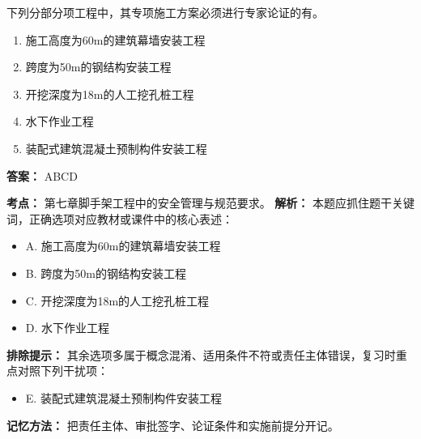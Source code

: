 \documentclass[UTF8,fontset=fandol,11pt]{ctexart}
\begin{document}
\begin{quizbox}[title={第 7 题}]
下列分部分项工程中，其专项施工方案必须进行专家论证的有。\\
\begin{enumerate}[label=\Alph*.]
\item 施工高度为60m的建筑幕墙安装工程
\item 跨度为50m的钢结构安装工程
\item 开挖深度为18m的人工挖孔桩工程
\item 水下作业工程
\item 装配式建筑混凝土预制构件安装工程
\end{enumerate}
\textbf{答案：} ABCD
\vspace{0.25em}
\begin{answerbox}[title={考点解析}]
\textbf{考点：} 第七章脚手架工程中的安全管理与规范要求。
\textbf{解析：} 本题应抓住题干关键词，正确选项对应教材或课件中的核心表述：
\begin{itemize}
\item A. 施工高度为60m的建筑幕墙安装工程
\item B. 跨度为50m的钢结构安装工程
\item C. 开挖深度为18m的人工挖孔桩工程
\item D. 水下作业工程
\end{itemize}
\textbf{排除提示：} 其余选项多属于概念混淆、适用条件不符或责任主体错误，复习时重点对照下列干扰项：
\begin{itemize}
\item E. 装配式建筑混凝土预制构件安装工程
\end{itemize}
\textbf{记忆方法：} 把责任主体、审批签字、论证条件和实施前提分开记。
\end{answerbox}
\end{quizbox}
\end{document}
